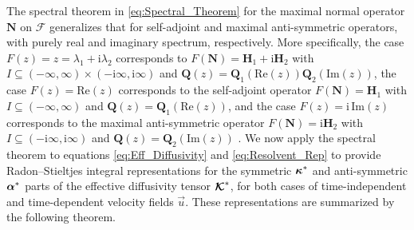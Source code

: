 \documentclass[11pt]{amsart}
\newcommand{\I}{\mathrm{i}}
\newcommand{\Hb}{\mathbf{H}}
\newcommand{\Qb}{\mathbf{Q}}
\newcommand{\Nb}{\mathbf{N}}
\newcommand\Kbc{\mbox{\boldmath${\mathcal{K}}$}}
\newcommand{\Fs}{\mathscr{F}}
\newcommand\balpha{\mbox{\boldmath${\alpha}$}}
\newcommand\bkappa{\mbox{\boldmath${\kappa}$}}
\begin{document}
 

The spectral theorem in \eqref{eq:Spectral_Theorem} for the maximal
normal operator $\Nb$ on $\Fs$ generalizes that for self-adjoint and
maximal anti-symmetric operators, with purely real and imaginary
spectrum, respectively. More specifically, the case
$F(z)=z=\lambda_1+\I\lambda_2$ corresponds to $F(\Nb)=\Hb_1+\I\Hb_2$ with
$I\subseteq(-\infty,\infty)\times(-\I\infty,\I\infty)$ and
$\Qb(z)=\Qb_1(\text{Re}(z))\Qb_2(\text{Im}(z))$, the case
$F(z)=\text{Re}(z)$ corresponds to the self-adjoint operator   
$F(\Nb)=\Hb_1$ with $I\subseteq(-\infty,\infty)$ and $\Qb(z)=\Qb_1(\text{Re}(z))$,
and the case $F(z)=\I\,\text{Im}(z)$ corresponds to the maximal
anti-symmetric operator $F(\Nb)=\I\Hb_2$ with $I\subseteq(-\I\infty,\I\infty)$ and
$\Qb(z)=\Qb_2(\text{Im}(z))$ \cite{Stone:64}. We now apply the
spectral theorem to equations \eqref{eq:Eff_Diffusivity} and
\eqref{eq:Resolvent_Rep} to provide Radon--Stieltjes integral
representations for the symmetric $\bkappa^*$ and anti-symmetric
$\balpha^*$ parts of the effective diffusivity tensor $\Kbc^*$, for
both cases of time-independent and time-dependent velocity fields
$\vec{u}$. These representations are summarized by the following
theorem.  
%
\end{document}
